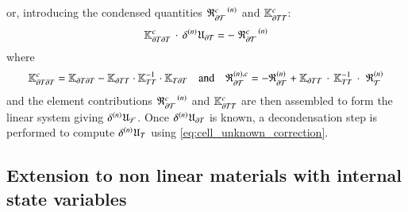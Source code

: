 %
%
%
or, introducing the condensed quantities
%
%
%
\(\iter{n}{\left.\mathfrak{R}^{c}_{\mathcal{\dCell}}\right.}\) and
\(\mathbb{K}_{\dCell\cell}^{c}\):
\[
\mathbb{K}_{\dCell\dCell}^{c}\,\cdot\,\iter{n}{\delta}\mathfrak{U}_{\dCell}=
-\iter{n}{\left.\mathfrak{R}^{c}_{\mathcal{\dCell}}\right.}
\]
%
%
%
where
%
%
%
\begin{equation}
  \begin{aligned}
    \mathbb{K}_{\dCell\dCell}^{c}
    =
    \mathbb{K}_{\dCell\dCell}
    -
    \mathbb{K}_{\dCell\cell} \cdot \mathbb{K}_{\cell\cell}^{-1} \cdot \mathbb{K}_{\cell\dCell}
    &&
    \text{and}
    &&
    \mathfrak{R}^{(n), c}_{\mathcal{\dCell}}
    =
    -\iter{n}{\mathfrak{R}}_{\mathcal{\dCell}}
    +\mathbb{K}_{\dCell\cell}\,\cdot\,\mathbb{K}_{\cell\cell}^{-1}\,\cdot\,\,\iter{n}{\mathfrak{R}}_{\mathcal{\cell}}
  \end{aligned}
\end{equation}
%
%
%
and the element contributions
\(\iter{n}{\left.\mathfrak{R}^{c}_{\mathcal{\dCell}}\right.}\) and
\(\mathbb{K}_{\dCell\cell}^{c}\) are then assembled to form the linear
system giving \(\iter{n}{\delta}\mathfrak{U}_{\mathcal{F}}\). Once
\(\iter{n}{\delta}\mathfrak{U}_{\dCell}\) is known, a decondensation
step is performed to compute \(\iter{n}{\delta}\mathfrak{U}_{\cell}\)
using \eqref{eq:cell_unknown_correction}.


\subsection{Extension to non linear materials with internal state variables}
\label{sec:discretization:extension_to_non_linear_materials}


